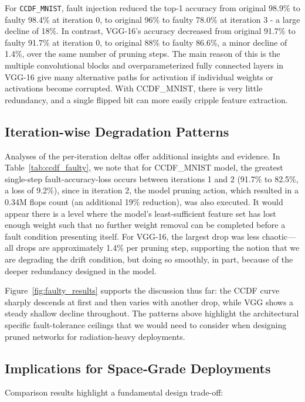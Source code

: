 For \texttt{CCDF\_MNIST}, fault injection reduced the top‐1 accuracy from original 98.9\% to faulty 98.4\%  at iteration 0, to original 96\% to faulty 78.0\% at iteration 3 - a large decline of 18\%. In contrast, VGG-16’s accuracy decreased from original 91.7\% to faulty 91.7\% at iteration 0, to original 88\% to faulty 86.6\%, a minor decline of 1.4\%, over the same number of pruning steps. The main reason of this is the multiple convolutional blocks and overparameterized fully connected layers in VGG-16 give many alternative paths for activation if individual weights or activations become corrupted. With CCDF\_MNIST, there is very little redundancy, and a single flipped bit can more easily cripple feature extraction.
  

\subsection{Iteration-wise Degradation Patterns}

Analyses of the per-iteration deltas offer additional insights and evidence. In Table~\ref{tab:ccdf_faulty}, we note that for CCDF\_MNIST model, the greatest single-step fault-accuracy-loss occurs between iterations 1 and 2 (91.7\% to 82.5\%, a loss of 9.2\%), since in iteration 2, the model pruning action, which resulted in a 0.34M \gls{flops} count (an additional 19\% reduction), was also executed. It would appear there is a level where the model’s least-sufficient feature set has lost enough weight such that no further weight removal can be completed before a fault condition presenting itself. For VGG-16, the largest drop was less chaotic—all drops are approximately 1.4\% per pruning step, supporting the notion that we are degrading the drift condition, but doing so smoothly, in part, because of the deeper redundancy designed in the model.

Figure~\ref{fig:faulty_results} supports the discussion thus far: the CCDF curve sharply descends at first and then varies with another drop, while VGG shows a steady shallow decline throughout. The patterns above highlight the architectural specific fault-tolerance ceilings that we would need to consider when designing pruned networks for radiation-heavy deployments.



\subsection{Implications for Space‐Grade Deployments}
Comparison results highlight a fundamental design trade-off: 

